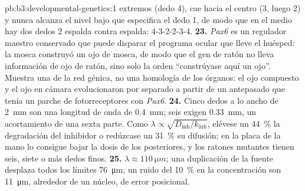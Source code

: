 \begin{solution}{pb:b3:developmental-genetics:1}
extremos (dedo 4), cae hacia el centro (3, luego 2) y nunca alcanza el
nivel bajo que especifica el dedo 1, de modo que en el medio hay dos
dedos 2 espalda contra espalda: 4-3-2-2-3-4.
\textbf{23.} \emph{Pax6} es un regulador maestro conservado que puede
disparar el programa ocular que lleve el huésped: la mosca construyó un
ojo de mosca, de modo que el gen de ratón no lleva información de ojo
de ratón, sino solo la orden ``constrúyase aquí un ojo''. Muestra una
 de la red génica, no una homología de los órganos:
el ojo compuesto y el ojo en cámara evolucionaron por separado a partir
de un antepasado que tenía un parche de fotorreceptores con
\emph{Pax6}.
\textbf{24.} Cinco dedos a lo ancho de \qty{2}{mm} son una longitud de
onda de \qty{0.4}{mm}; seis exigen \qty{0.33}{mm}, un acortamiento de
una sexta parte. Como $\lambda \propto \sqrt{D_{\text{inh}}/k_{\text{inh}}}$,
elévese un \qty{44}{\%} la degradación del inhibidor o redúzcase un
\qty{31}{\%} su difusión; en la placa de la mano lo consigue bajar la
dosis de los  posteriores, y los ratones mutantes tienen seis,
siete o más dedos finos.
\textbf{25.} $\lambda \approx \qty{110}{\micro m}$; una duplicación de
la fuente desplaza todos los límites \qty{76}{\micro m}; un ruido del
\qty{10}{\%} en la concentración son \qty{11}{\micro m}, alrededor de un
núcleo, de error posicional.
\end{solution}
